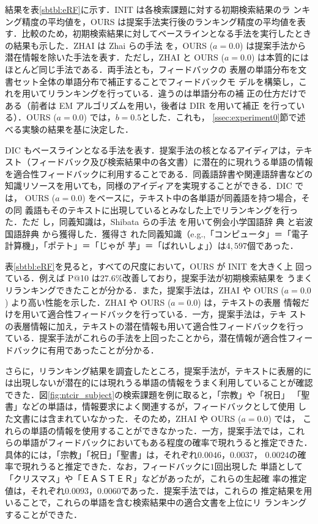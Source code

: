 \documentclass[japanese]{jnlp_1.4}
\begin{document}
結果を表\ref{sbtbl:eRF}に示す．INIT は各検索課題に対する初期検索結果のラ
ンキング精度の平均値を，OURS は提案手法実行後のランキング精度の平均値を表
す．比較のため，初期検索結果に対してベースラインとなる手法を実行したとき
の結果も示した．ZHAI は Zhai らの手法 \cite{Zhai2001}を，OURS ($a =
0.0$) は提案手法から潜在情報を除いた手法を表す．ただし，ZHAI と OURS ($a
= 0.0$) は本質的にはほとんど同じ手法である．両手法とも，フィードバックの
表層の単語分布を文書セット全体の単語分布で補正することでフィードバックモ
デルを構築し，これを用いてリランキングを行っている．違うのは単語分布の補
正の仕方だけである（前者は EM アルゴリズムを用い，後者は DIR を用いて補正
を行っている）．OURS ($a = 0.0$) では，$b = 0.5$とした．これも，
\ref{ssec:experiment0}節で述べる実験の結果を基に決定した．

DIC もベースラインとなる手法を表す．提案手法の核となるアイディアは，テキ
スト（フィードバック及び検索結果中の各文書）に潜在的に現れうる単語の情報
を適合性フィードバックに利用することである．同義語辞書や関連語辞書などの
知識リソースを用いても，同様のアイディアを実現することができる．DIC では，
OURS ($a = 0.0$) をベースに，テキスト中の各単語が同義語を持つ場合，その同
義語もそのテキストに出現しているとみなした上でリランキングを行った．ただ
し，同義知識は，Shibata らの手法 \cite{Shibata2008}を用いて例会小学国語辞
典 \cite{Tajika2001}と岩波国語辞典 \cite{Nishio2002}から獲得した．獲得さ
れた同義知識（e.g.,「コンピュータ」＝「電子計算機」，「ポテト」＝「じゃが
芋」＝「ばれいしょ」）は$4,597$個であった．

表\ref{sbtbl:eRF}を見ると，すべての尺度において，OURS が INIT を大きく上
回っている．例えば P@10 は$27.6\%$改善しており，提案手法が初期検索結果を
うまくリランキングできたことが分かる．また，提案手法は，ZHAI や OURS ($a
= 0.0$) より高い性能を示した．ZHAI や OURS ($a = 0.0$) は，テキストの表層
情報だけを用いて適合性フィードバックを行っている．一方，提案手法は，テキ
ストの表層情報に加え，テキストの潜在情報も用いて適合性フィードバックを行っ
ている．提案手法がこれらの手法を上回ったことから，潜在情報が適合性フィー
ドバックに有用であったことが分かる．

さらに，リランキング結果を調査したところ，提案手法が，テキストに表層的に
は出現しないが潜在的には現れうる単語の情報をうまく利用していることが確認
できた．図\ref{fig:ntcir_subject}の検索課題を例に取ると，「宗教」や「祝日」
「聖書」などの単語は，情報要求によく関連するが，フィードバックとして使用
した文書には含まれていなかった．そのため，ZHAI や OURS ($a = 0.0$) では，
これらの単語の情報を使用することができなかった．一方，提案手法では，これ
らの単語がフィードバックにおいてもある程度の確率で現れうると推定できた．
具体的には，「宗教」「祝日」「聖書」は，それぞれ$0.0046$，$0.0037$，
$0.0024$の確率で現れうると推定できた．なお，フィードバックに$1$回出現した
単語として「クリスマス」や「ＥＡＳＴＥＲ」などがあったが，これらの生起確
率の推定値は，それぞれ$0.0093$，$0.0060$であった．提案手法では，これらの
推定結果を用いることで，これらの単語を含む検索結果中の適合文書を上位にリ
ランキングすることができた．
\end{document}
